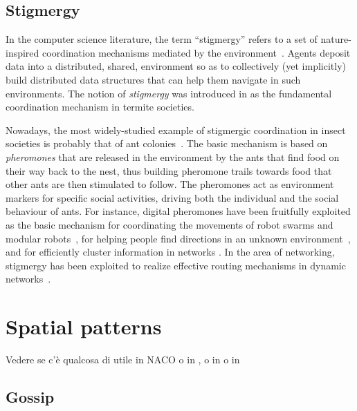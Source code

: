 \documentclass[12pt,a4paper,twoside,openright]{book}
\begin{document}
\subsection{Stigmergy}

In the computer science literature, the term ``stigmergy'' refers to a set of nature-inspired coordination mechanisms mediated by the environment~\cite{stigmergyhistory-artificiallife5,stigmergy-artificiallife5}.
%
Agents deposit data into a distributed, shared, environment so as to collectively (yet implicitly) build distributed data structures that can help them navigate in such environments.
%
The notion of \emph{stigmergy} was introduced in \cite{stigmergy-grasse59} as the fundamental coordination mechanism in termite societies.

Nowadays, the most widely-studied example of stigmergic coordination in insect societies is probably that of ant colonies~\cite{dorigo-aco2004}.
%
The basic mechanism is based on \emph{pheromones} that are released in the environment by the ants that find food on their way back to the nest, thus building pheromone trails towards food that other ants are then stimulated to follow.
%
The pheromones act as environment markers for specific social activities, driving both the individual and the social behaviour of ants.
%
For instance, digital pheromones \cite{pheromoncoord-aamas2002,stigmergy-e4masII} have been fruitfully exploited as the basic mechanism for coordinating the movements of robot swarms and modular robots~\cite{tota-aamas2005}, for helping people find directions in an unknown environment~\cite{MameiZ07}, and for efficiently cluster information in networks \cite{collectivesort-scico74,wordNet}.
%
In the area of networking, stigmergy has been exploited to realize effective routing mechanisms in dynamic networks~\cite{swarmintelligence-book1999,AC-Survey}.





\section{Spatial patterns}

Vedere se c'è qualcosa di utile in NACO \cite{FDMVA-NACO2012} o in \cite{GVO-CEEMAS2007}, o in \cite{ecosystems-jpcc7} o in \cite{BabaogluPatterns}

\subsection{Gossip}
\end{document}
